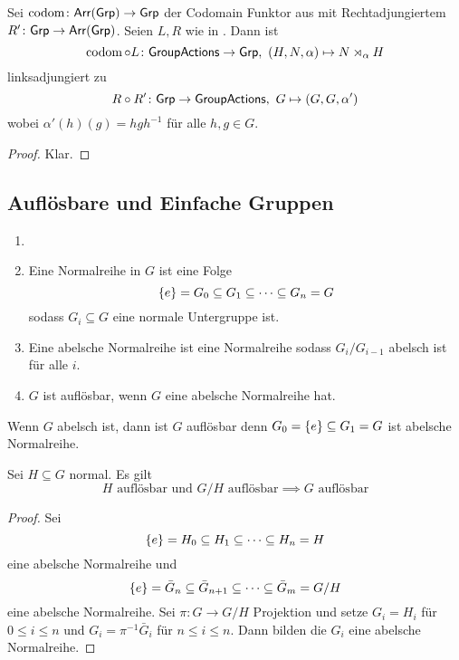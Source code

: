 \begin{Lemma}
    Sei \(\operatorname{codom}\colon \mathsf{Arr}(\mathsf{Grp})\to\mathsf{Grp}\) der Codomain Funktor aus  mit Rechtadjungiertem \(R'\colon\mathsf{Grp}\to\mathsf{Arr}(\mathsf{Grp})\).
    Seien \(L,R\) wie in . Dann ist \[\operatorname{codom}\circ L\colon \mathsf{GroupActions}\to \mathsf{Grp},\ (H,N,\alpha)\mapsto N\rtimes_\alpha H\] linksadjungiert zu 
    \[R\circ R'\colon \mathsf{Grp}\to\mathsf{GroupActions},\ G\mapsto (G,G,\alpha')\] wobei \(\alpha'(h)(g)=hgh^{-1}\) für alle \(h,g\in G\).
\end{Lemma}
\begin{proof}
    Klar.
\end{proof}
    

\subsection{Auflösbare und Einfache Gruppen}
\begin{Def}
    \begin{enumerate}
        \item []
        \item Eine Normalreihe in \(G\) ist eine Folge \[\{e\}=G_0\subseteq G_1\subseteq \dots\subseteq G_n=G\] sodass \(G_i\subseteq G\) eine normale Untergruppe ist.
        \item Eine abelsche Normalreihe ist eine Normalreihe sodass \(G_i/G_{i-1}\) abelsch ist für alle \(i\).
        \item \(G\) ist auflösbar, wenn \(G\) eine abelsche Normalreihe hat.
    \end{enumerate}
\end{Def}
\begin{Bsp}
    Wenn \(G\) abelsch ist, dann ist \(G\) auflösbar denn \(G_0=\{e\}\subseteq G_1=G\) ist abelsche Normalreihe.
\end{Bsp}
\begin{Lemma}\label{Lem:AuflUntQuot}
    Sei \(H\subseteq G\) normal. Es gilt 
    \[H \text{ auflösbar und } G/H \text{ auflösbar}\implies G \text{ auflösbar}\]
\end{Lemma}
\begin{proof}
    Sei \[\{e\}=H_0\subseteq H_1\subseteq \dots\subseteq H_n=H\] eine abelsche Normalreihe und \[\{e\}=\bar G_n\subseteq\bar G_{n+1}\subseteq\dots \subseteq \bar G_m=G/H\] eine abelsche Normalreihe. Sei \(\pi\colon G\to G/H\) Projektion und setze \(G_i=H_i\) für \(0\leq i\leq n\) und \(G_i=\pi^{-1}\bar G_i\)  für \(n\leq i\leq n\).
    Dann bilden die \(G_i\) eine abelsche Normalreihe.
\end{proof}

